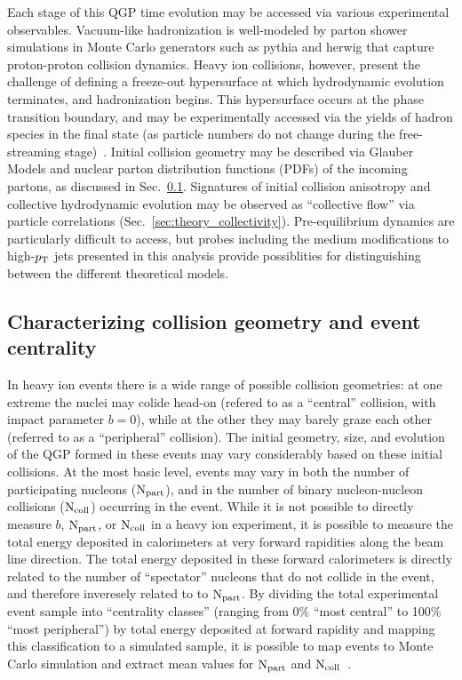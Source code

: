 \noindent Each stage of this QGP time evolution may be accessed via various experimental observables.  Vacuum-like hadronization is well-modeled by parton shower simulations in Monte Carlo generators such as {\sc pythia} and {\sc herwig} that capture proton-proton collision dynamics. Heavy ion collisions, however, present the challenge of defining a freeze-out hypersurface at which hydrodynamic evolution terminates, and hadronization begins. This hypersurface occurs at the phase transition boundary, and may be experimentally accessed via the yields of hadron species in the final state (as particle numbers do not change during the free-streaming stage)~\cite{Sarkar:2010zza}.  Initial collision geometry may be described via Glauber Models and nuclear parton distribution functions (PDFs) of the incoming partons, as discussed in Sec.~\ref{sec:glauber}.  Signatures of initial collision anisotropy and collective hydrodynamic evolution may be observed as ``collective flow'' via particle correlations (Sec.~\ref{sec:theory_collectivity}).  Pre-equilibrium dynamics are particularly difficult to access, but probes including the medium modifications to high-$p_{\rm T}$ jets presented in this analysis provide possiblities for distinguishing between the different theoretical models. 


\subsection{Characterizing collision geometry and event centrality}
\label{sec:glauber}

In heavy ion events there is a wide range of possible collision geometries:  at one extreme the nuclei may colide head-on (refered to as a ``central'' collision, with impact parameter $b=0$), while at the other they may barely graze each other (referred to as a ``peripheral'' collision).  The initial geometry, size, and evolution of the QGP formed in these events may vary considerably based on these initial collisions.  At the most basic level, events may vary in both the number of participating nucleons ($\rm N_{part}$), and in the number of binary nucleon-nucleon collisions ($\rm N_{coll}$) occurring in the event.  While it is not possible to directly measure $b$, $\rm N_{part}$, or $\rm N_{coll}$ in a heavy ion experiment, it is possible to measure the total energy deposited in calorimeters at very forward rapidities along the beam line direction.  The total energy deposited in these forward calorimeters is directly related to the number of ``spectator'' nucleons that do not collide in the event, and therefore inveresely related to to $\rm N_{part}$.  By dividing the total experimental event sample into ``centrality classes'' (ranging from 0\% ``most central'' to 100\% ``most peripheral'') by total energy deposited at forward rapidity and mapping this classification to a simulated sample, it is possible to map events to Monte Carlo simulation and extract mean values for $\rm N_{part}$ and $\rm N_{coll}$~\cite{Miller:2007ri}.


